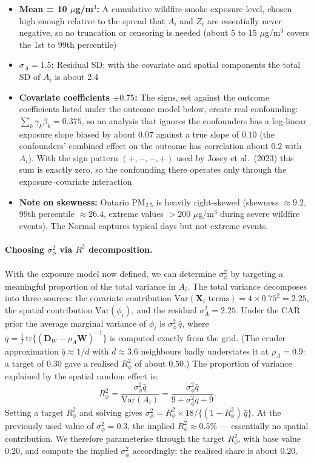 \documentclass[11pt]{article}
\begin{document}
\begin{itemize}
\item \textbf{Mean = 10 $\mu$g/m$^3$:} A cumulative wildfire-smoke exposure level, chosen high enough
relative to the spread that $A_i$ and $Z_i$ are essentially never negative, so no truncation or
censoring is needed (about 5 to 15 $\mu$g/m$^3$ covers the 1st to 99th percentile)
\item \textbf{$\sigma_A = 1.5$:} Residual SD; with the covariate and spatial components the total SD of $A_i$
is about 2.4
\item \textbf{Covariate coefficients $\pm 0.75$:} The signs, set against the outcome coefficients listed under the
outcome model below, create real confounding: $\sum_k \gamma_k \beta_k = 0.375$, so an
analysis that ignores the confounders has a log-linear exposure slope biased by about $0.07$ against a true
slope of $0.10$ (the confounders' combined effect on the outcome has correlation about $0.2$ with $A_i$).
With the sign pattern $(+,-,-,+)$ used by Josey et al.\ (2023) this sum is exactly zero, so the confounding
there operates only through the exposure--covariate interaction
\item \textbf{Note on skewness:} Ontario PM$_{2.5}$ is heavily right-skewed (skewness
$\approx 9.2$, 99th percentile $\approx 26.4$, extreme values $> 200$ $\mu$g/m$^3$
during severe wildfire events). The Normal captures typical days but not extreme events.
\end{itemize}

\paragraph{Choosing $\sigma_\phi^2$ via $R^2$ decomposition.}
With the exposure model now defined, we can determine $\sigma_\phi^2$ by targeting a
meaningful proportion of the total variance in $A_i$. The total variance decomposes into
three sources: the covariate contribution $\text{Var}(\mathbf{X}_i\text{ terms}) =
4 \times 0.75^2 = 2.25$, the spatial contribution $\text{Var}(\phi_i)$, and the residual
$\sigma_A^2 = 2.25$. Under the CAR prior the average marginal variance of $\phi_i$ is
$\sigma_\phi^2 \, \bar{q}$, where $\bar{q} = \frac{1}{I}\,\text{tr}\{(\mathbf{D}_W -
\rho_A\mathbf{W})^{-1}\}$ is computed exactly from the grid. (The cruder approximation
$\bar{q} \approx 1/\bar{d}$ with $\bar{d} \approx 3.6$ neighbours badly understates it at
$\rho_A = 0.9$: a target of $0.30$ gave a realised $R^2_\phi$ of about $0.50$.) The
proportion of variance explained by the spatial random effect is:
\[
R^2_\phi = \frac{\sigma_\phi^2 \bar{q}}{\text{Var}(A_i)} = \frac{\sigma_\phi^2 \bar{q}}{9 + \sigma_\phi^2 \bar{q} + 9}.
\]
Setting a target $R^2_\phi$ and solving gives $\sigma_\phi^2 = R^2_\phi \times 18 /
\{(1 - R^2_\phi)\,\bar{q}\}$. At the previously used value of $\sigma_\phi^2 = 0.3$, the
implied $R^2_\phi \approx 0.5\%$ --- essentially no spatial contribution. We therefore
parameterise through the target $R^2_\phi$, with base value $0.20$, and compute the
implied $\sigma_\phi^2$ accordingly; the realised share is about $0.20$.
\end{document}
